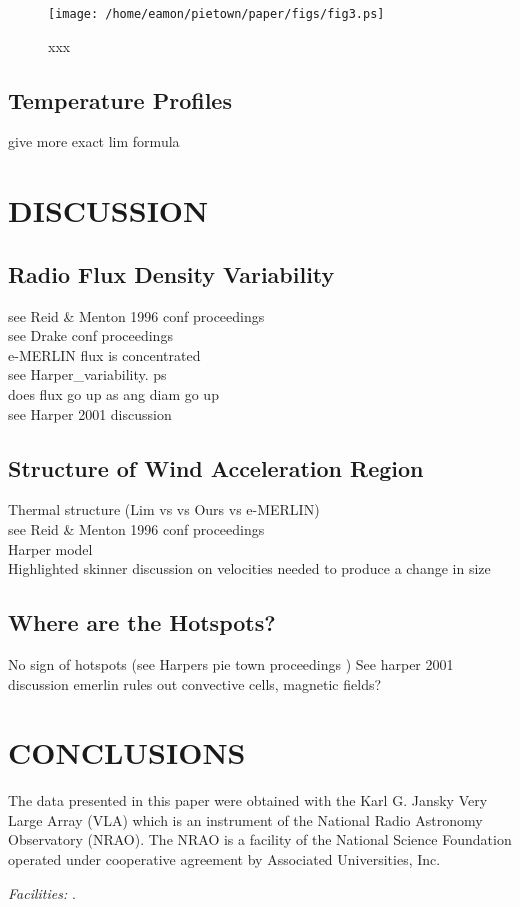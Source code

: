 \documentclass[iop]{emulateapj}
\begin{document}
\begin{figure}
\texttt{[image: /home/eamon/pietown/paper/figs/fig3.ps]}
\caption{xxx }
\label{fig3}
\end{figure}

\subsection{Temperature Profiles}
give more exact lim formula 

\section{DISCUSSION}
\subsection{Radio Flux Density Variability} 
see Reid \& Menton 1996 conf proceedings\\
see Drake conf proceedings\\
e-MERLIN flux is concentrated\\
see Harper\_variability. ps\\
does flux go up as ang diam go up\\
see Harper 2001 discussion

\subsection{Structure of Wind Acceleration Region} 
Thermal structure (Lim vs vs Ours vs e-MERLIN)\\
see Reid \& Menton 1996 conf proceedings\\
Harper model\\
Highlighted skinner discussion on velocities needed to produce a change in size

\subsection{Where are the Hotspots?}

No sign of hotspots (see Harpers pie town proceedings )
See harper 2001 discussion	
emerlin rules out convective cells, magnetic fields?





\section{CONCLUSIONS}
 


\acknowledgments
The data presented in this paper were obtained with the Karl G. Jansky Very Large Array (VLA) which is an instrument of the National Radio Astronomy Observatory (NRAO). The NRAO is a facility of the National Science Foundation operated under cooperative agreement by Associated Universities, Inc. 

{\it Facilities:} .




\end{document}

